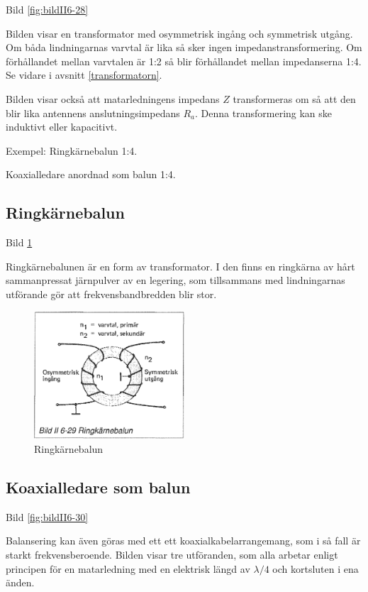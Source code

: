 Bild \ref{fig:bildII6-28}

Bilden visar en transformator med osymmetrisk ingång och symmetrisk
utgång. Om båda lindningarnas varvtal är lika så sker ingen
impedanstransformering. Om förhållandet mellan varvtalen är 1:2 så
blir förhållandet mellan impedanserna 1:4. Se vidare i avsnitt \ref{transformatorn}.

Bilden visar också att matarledningens impedans \(Z\) transformeras om så
att den blir lika antennens anslutningsimpedans \(R_a\).  Denna
transformering kan ske induktivt eller kapacitivt.

Exempel:
Ringkärnebalun 1:4.

Koaxialledare anordnad som balun 1:4.

\subsection{Ringkärnebalun}

Bild \ref{fig:bildII6-29}

Ringkärnebalunen är en form av transformator. I den finns en ringkärna
av hårt sammanpressat järnpulver av en legering, som tillsammans med
lindningarnas utförande gör att frekvensbandbredden blir stor.

\begin{figure}
  \includegraphics[width=0.5\textwidth]{images/bild_2_6-29}
  \caption{Ringkärnebalun}
  \label{fig:bildII6-29}
\end{figure}

\subsection{Koaxialledare som balun}

Bild \ref{fig:bildII6-30}

Balansering kan även göras med ett ett koaxialkabelarrangemang, som i
så fall är starkt frekvensberoende. Bilden visar tre utföranden, som
alla arbetar enligt principen för en matarledning med en elektrisk
längd av \(\lambda/4\) och kortsluten i ena änden.

